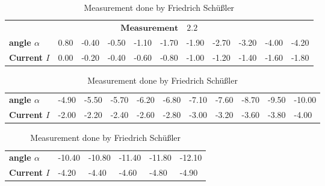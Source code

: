     \begin{table}[htdp]
        \begin{tabular}{|l||p{1.1cm}|p{1.1cm}|p{1.1cm}|p{1.1cm}|p{1.1cm}|p{1.1cm}|p{1.1cm}|p{1.1cm}|p{1.1cm}|p{1.1cm}|}
        \hline
            \multicolumn{11}{|c|}{\cellcolor[RGB]{206,250,201}$
            \mathbf{Measurement \quad 2.2}$} \\
\textbf{angle $\alpha$}& 0.80& -0.40& -0.50& -1.10& -1.70& -1.90& -2.70& -3.20& -4.00& -4.20 \\
\textbf{Current $I$}& 0.00& -0.20& -0.40& -0.60& -0.80& -1.00& -1.20& -1.40& -1.60& -1.80 \\

        \hline
        \end{tabular}
        \begin{tabular}{|l||p{1.1cm}|p{1.1cm}|p{1.1cm}|p{1.1cm}|p{1.1cm}|p{1.1cm}|p{1.1cm}|p{1.1cm}|p{1.1cm}|p{1.1cm}|}
        \hline\textbf{angle $\alpha$}& -4.90& -5.50& -5.70& -6.20& -6.80& -7.10& -7.60& -8.70& -9.50& -10.00 \\
\textbf{Current $I$}& -2.00& -2.20& -2.40& -2.60& -2.80& -3.00& -3.20& -3.60& -3.80& -4.00 \\

        \hline
        \end{tabular}
    \begin{tabular}{|l||p{1.1cm}|p{1.1cm}|p{1.1cm}|p{1.1cm}|p{1.1cm}|}
    \hline\textbf{angle $\alpha$}& -10.40& -10.80& -11.40& -11.80& -12.10 \\
\textbf{Current $I$}& -4.20& -4.40& -4.60& -4.80& -4.90 \\

    \hline
    \end{tabular}
    \caption{Measurement done by Friedrich Schüßler}
    \label{Power05}
    \end{table}

